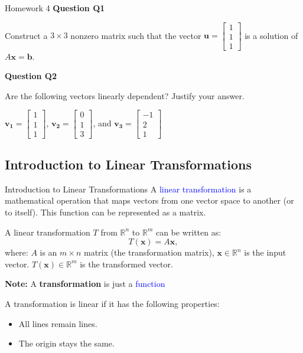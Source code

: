 \documentclass[10pt, aspectratio=169]{beamer}
\begin{document}
\begin{frame}{Homework 4}
\textbf{Question Q1}

Construct a \(3\times 3\) nonzero matrix such that the vector
    \( \mathbf{u} = 
   \begin{bmatrix}
       1\\
       1\\
       1
   \end{bmatrix} \)
is a solution of \(A\mathbf{x} = \mathbf{b}\).


\textbf{Question Q2}

Are the following vectors linearly dependent? Justify your answer.

\( \mathbf{v_1} = 
   \begin{bmatrix}
       1\\
       1\\
       1
   \end{bmatrix} \), 
   \( \mathbf{v_2} = 
   \begin{bmatrix}
       0\\
       1\\
       3
   \end{bmatrix} \), and 
   \( \mathbf{v_3} = 
   \begin{bmatrix}
       -1\\
       2\\
       1
   \end{bmatrix} \)
\end{frame}



\subsection{Introduction to Linear Transformations}
\begin{frame}{Introduction to Linear Transformations}
A \textcolor{blue}{linear transformation} is a mathematical operation that maps vectors from one vector space to another (or to itself).
This function can be represented as a matrix.

A linear transformation \( T \) from \( \mathbb{R}^n \) to \( \mathbb{R}^m \) can be written as:
\[
T(\mathbf{x}) = A\mathbf{x},
\]
where: \( A \) is an \(m \times n\) matrix (the transformation matrix), \( \mathbf{x} \in \mathbb{R}^n \) is the input vector.
\( T(\mathbf{x}) \in \mathbb{R}^m \) is the transformed vector.

\textbf{Note:} A \textbf{transformation} is just a \textcolor{blue}{function}

A transformation is linear if it has the following properties:
\begin{itemize}
    \item All lines remain lines.
    \item The origin stays the same.
\end{itemize}
\end{frame}
\end{document}
